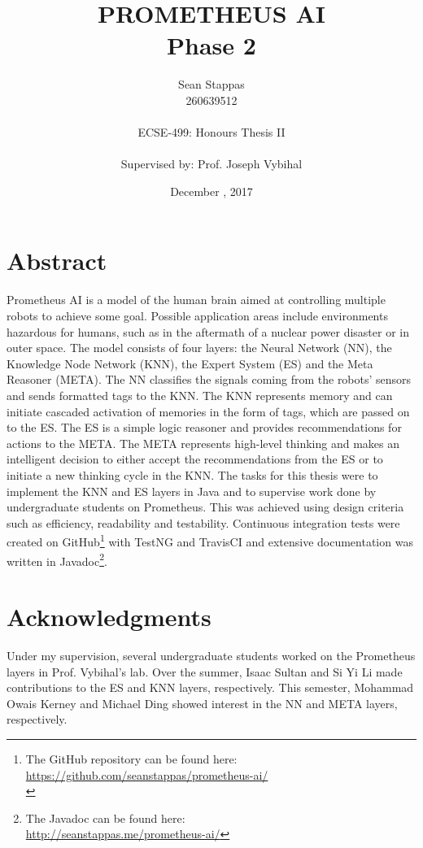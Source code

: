 \documentclass[titlepage,11pt]{article}
\title
{
	\uppercase{Prometheus AI} \\
	\large Phase 2
}
\author %
{
	Sean Stappas \\ 
	260639512 \\
	\\ 
	ECSE-499: Honours Thesis II \\
	\\
	\small Supervised by: Prof. Joseph Vybihal
}
\date{December \nth{7}, 2017}
\begin{document}
	
\sloppy

\maketitle

\section*{Abstract}
Prometheus AI is a model of the human brain aimed at controlling multiple robots to achieve some goal. Possible application areas include environments hazardous for humans, such as in the aftermath of a nuclear power disaster or in outer space. The model consists of four layers: the Neural Network (NN), the Knowledge Node Network (KNN), the Expert System (ES) and the Meta Reasoner (META). The NN classifies the signals coming from the robots' sensors and sends formatted tags to the KNN. The KNN represents memory and can initiate cascaded activation of memories in the form of tags, which are passed on to the ES. The ES is a simple logic reasoner and provides recommendations for actions to the META. The META represents high-level thinking and makes an intelligent decision to either accept the recommendations from the ES or to initiate a new thinking cycle in the KNN. The tasks for this thesis were to implement the KNN and ES layers in Java and to supervise work done by undergraduate students on Prometheus. This was achieved using design criteria such as efficiency, readability and testability. Continuous integration tests were created on GitHub\footnote{The GitHub repository can be found here:\\ \url{https://github.com/seanstappas/prometheus-ai/}\\} with TestNG and TravisCI and extensive documentation was written in Javadoc\footnote{The Javadoc can be found here:\\ \url{http://seanstappas.me/prometheus-ai/}}.

\section*{Acknowledgments}
Under my supervision, several undergraduate students worked on the Prometheus layers in Prof. Vybihal's lab. Over the summer, Isaac Sultan and Si Yi Li made contributions to the ES and KNN layers, respectively. This semester, Mohammad Owais Kerney and Michael Ding showed interest in the NN and META layers, respectively.
\end{document}

